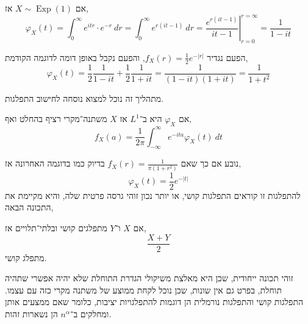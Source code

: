 \begin{example}
	אם $X \sim \operatorname{Exp}(1)$ אז,
	\[
		\varphi_X(t)
		= \int_{0}^{\infty} e^{itr} \cdot e^{-r}\ dr
		= \int_{0}^{\infty} e^{r(it - 1)}\ dr
		= \left. \frac{e^{r(it - 1)}}{it - 1} \right\rvert_{r = 0}^{r = \infty}
		= \frac{1}{1 - it}
	\]
\end{example}
\begin{example}
	הפעם נגדיר $f_X(r) = \frac{1}{2} e^{-|r|}$, והפעם נקבל באופן דומה לדוגמה הקודמת,
	\[
		\varphi_X(t)
		= \frac{1}{2} \frac{1}{1 - it} + \frac{1}{2} \frac{1}{1 + it}
		= \frac{1}{(1 - it)(1 + it)}
		= \frac{1}{1 + t^2}
	\]
\end{example}
מתהליך זה נוכל למצוא נוסחה לחישוב התפלגות.
\begin{proposition}
	אם $\varphi_X$ היא ב־$L^1$ אז $X$ משתנה־מקרי רציף בהחלט ואף,
	\[
		f_X(a)
		= \frac{1}{2 \pi} \int_{-\infty}^{\infty} e^{-ita} \varphi_X(t)\ dt
	\]
\end{proposition}
נובע אם כך שאם $f_X(r) = \frac{1}{\pi(1 + r^2)}$ בדיוק כמו בדוגמה האחרונה אז,
\[
	\varphi_X(t)
	= \frac{1}{2} e^{-|t|}
\]
להתפלגות זו קוראים התפלגות קושי, או יותר נכון זוהי גרסה פרטית שלה,
והיא מקיימת את התכונה הבאה,
\begin{proposition}
	אם $X$ ו־$Y$ מתפלגים קושי ובלתי־תלויים אז,
	\[
		\frac{X + Y}{2}
	\]
	מתפלג קושי.
\end{proposition}
זוהי תכונה ייחודית, שכן היא מאלצת משיקולי הגדרת התוחלת שלא יהיה אפשרי שתהיה תוחלת, בפרט גם אין שונות, שכן נוכל לקחת ממוצע של משתנה מקרי כזה עם עצמו.
התפלגות קושי והתפלגות נורמלית הן דוגמות להתפלגויות יציבות, כלומר שאם ממצעים אותן ומחלקים ב־$n^{\alpha}$ הן נשארות זהות.

\listoftheorems[title=הגדרות ומשפטים,ignoreall,show={theorem,definition},swapnumber,onlynamed={proposition}]

